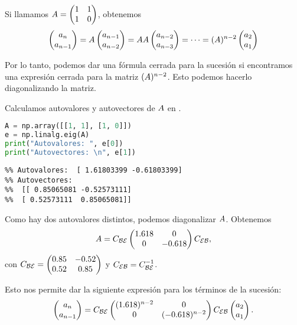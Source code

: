 Si llamamos $\Ab = \begin{pmatrix} 1 & 1 \\ 1 & 0 \end{pmatrix}$, obtenemos
$$
\begin{pmatrix} a_{n} \\ a_{n-1} \end{pmatrix} =
\Ab \begin{pmatrix} a_{n-1} \\ a_{n-2} \end{pmatrix} = \Ab \Ab \begin{pmatrix} a_{n-2} \\ a_{n-3} \end{pmatrix} = \dots = (\Ab)^{n-2} \begin{pmatrix} a_{2} \\ a_{1} \end{pmatrix}
$$

Por lo tanto, podemos dar una fórmula cerrada para la sucesión si encontramos una expresión cerrada para la matriz $(\Ab)^{n-2}$. Esto podemos hacerlo diagonalizando la matriz.

Calculamos autovalores y autovectores de $\Ab$ en \python.

\begin{Shaded}
\begin{lstlisting}[language=python]
A = np.array([[1, 1], [1, 0]])
e = np.linalg.eig(A)
print("Autovalores: ", e[0])
print("Autovectores: \n", e[1])
\end{lstlisting}
\end{Shaded}

\begin{verbatim}
%% Autovalores:  [ 1.61803399 -0.61803399]
%% Autovectores:
%%  [[ 0.85065081 -0.52573111]
%%  [ 0.52573111  0.85065081]]
\end{verbatim}

Como hay dos autovalores distintos, podemos diagonalizar $\Ab$. Obtenemos
$$
\Ab = \Cb_{\B\E} \begin{pmatrix} 1.618 & 0 \\ 0 & -0.618 \end{pmatrix} \Cb_{\E\B},
$$
con $\Cb_{\B\E} = \begin{pmatrix} 0.85 & -0.52 \\ 0.52 & 0.85 \end{pmatrix}$ y $\Cb_{\E\B} = \Cb_{\B\E}^{-1}$.

Esto nos permite dar la siguiente expresión para los términos de la sucesión:
$$
\begin{pmatrix} a_{n} \\ a_{n-1} \end{pmatrix} =
\Cb_{\B\E} \begin{pmatrix} (1.618)^{n-2} & 0 \\ 0 & (-0.618)^{n-2} \end{pmatrix} \Cb_{\E\B} \begin{pmatrix} a_{2} \\ a_{1} \end{pmatrix}.
$$


